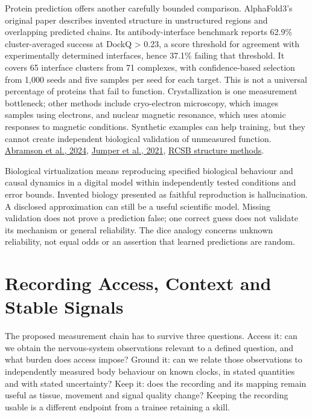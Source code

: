 Protein prediction offers another carefully bounded comparison. AlphaFold3's original paper describes invented structure in unstructured regions and overlapping predicted chains. Its antibody-interface benchmark reports 62.9\% cluster-averaged success at DockQ > 0.23, a score threshold for agreement with experimentally determined interfaces, hence 37.1\% failing that threshold. It covers 65 interface clusters from 71 complexes, with confidence-based selection from 1,000 seeds and five samples per seed for each target. This is not a universal percentage of proteins that fail to function. Crystallization is one measurement bottleneck; other methods include cryo-electron microscopy, which images samples using electrons, and nuclear magnetic resonance, which uses atomic responses to magnetic conditions. Synthetic examples can help training, but they cannot create independent biological validation of unmeasured function. \href{https://www.nature.com/articles/s41586-024-07487-w}{Abramson et al., 2024}, \href{https://www.nature.com/articles/s41586-021-03819-2}{Jumper et al., 2021}, \href{https://pdb101.rcsb.org/learn/guide-to-understanding-pdb-data/methods-for-determining-structure}{RCSB structure methods}.\par

Biological virtualization means reproducing specified biological behaviour and causal dynamics in a digital model within independently tested conditions and error bounds. Invented biology presented as faithful reproduction is hallucination. A disclosed approximation can still be a useful scientific model. Missing validation does not prove a prediction false; one correct guess does not validate its mechanism or general reliability. The dice analogy concerns unknown reliability, not equal odds or an assertion that learned predictions are random.\par

\section{Recording Access, Context and Stable Signals}

The proposed measurement chain has to survive three questions. Access it: can we obtain the nervous-system observations relevant to a defined question, and what burden does access impose? Ground it: can we relate those observations to independently measured body behaviour on known clocks, in stated quantities and with stated uncertainty? Keep it: does the recording and its mapping remain useful as tissue, movement and signal quality change? Keeping the recording usable is a different endpoint from a trainee retaining a skill.\par

